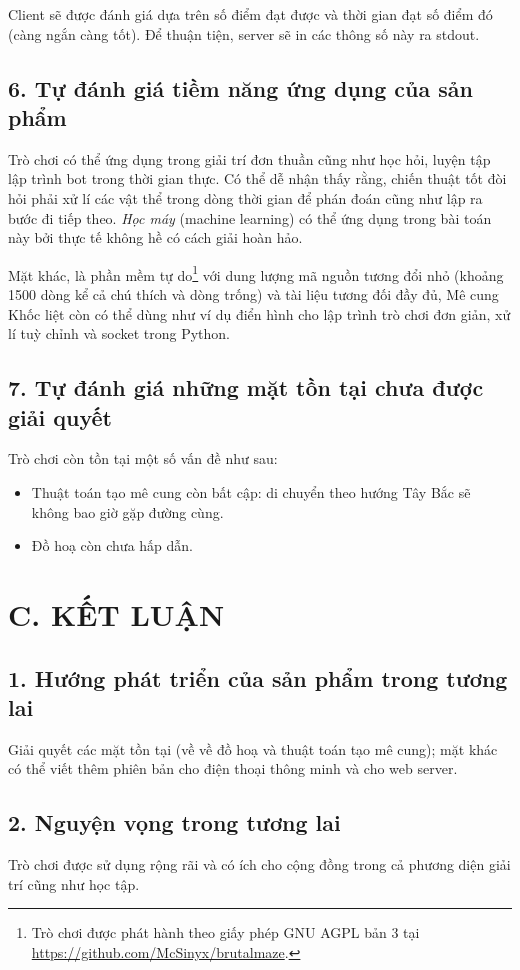 \documentclass[a4paper,12pt]{article}
\begin{document}
Client sẽ được đánh giá dựa trên số điểm đạt được và thời gian đạt số điểm đó
(càng ngắn càng tốt). Để thuận tiện, server sẽ in các thông số này ra stdout.

\subsection*{6. Tự đánh giá tiềm năng ứng dụng của sản phẩm}
Trò chơi có thể ứng dụng trong giải trí đơn thuần cũng như học hỏi, luyện tập
lập trình bot trong thời gian thực. Có thể dễ nhận thấy rằng, chiến thuật tốt
đòi hỏi phải xử lí các vật thể trong dòng thời gian để phán đoán cũng như lập ra
bước đi tiếp theo. \emph{Học máy} (machine learning) có thể ứng dụng trong bài
toán này bởi thực tế không hề có cách giải hoàn hảo.

Mặt khác, là phần mềm tự do\footnote{Trò chơi được phát hành theo giấy phép GNU
AGPL bản 3 tại \url{https://github.com/McSinyx/brutalmaze}.} với dung
lượng mã nguồn tương đổi nhỏ (khoảng 1500 dòng kể cả chú thích và dòng trống) và
tài liệu tương đối đầy đủ, Mê cung Khốc liệt còn có thể dùng như ví dụ điển hình
cho lập trình trò chơi đơn giản, xử lí tuỳ chỉnh và socket trong Python.

\subsection*{7. Tự đánh giá những mặt tồn tại chưa được giải quyết}
Trò chơi còn tồn tại một số vấn đề như sau:
\begin{itemize}
  \item Thuật toán tạo mê cung còn bất cập: di chuyển theo hướng Tây Bắc sẽ
    không bao giờ gặp đường cùng.~\cite{algo}
  \item Đồ hoạ còn chưa hấp dẫn.
\end{itemize}

\section*{C. KẾT LUẬN}
\subsection*{1. Hướng phát triển của sản phẩm trong tương lai}
Giải quyết các mặt tồn tại (về về đồ hoạ và thuật toán tạo mê cung); mặt khác có
thể viết thêm phiên bản cho điện thoại thông minh và cho web server.
\subsection*{2. Nguyện vọng trong tương lai}
Trò chơi được sử dụng rộng rãi và có ích cho cộng đồng trong cả phương diện giải
trí cũng như học tập.
\end{document}
